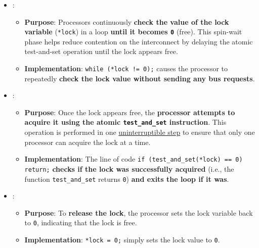 \begin{itemize}
    \item {}:
    \begin{itemize}
        \item \textbf{Purpose}: Processors continuously \textbf{check the value of the lock variable} (\texttt{*lock}) in a loop \textbf{until it becomes \texttt{0}} (free). This spin-wait phase helps reduce contention on the interconnect by delaying the atomic test-and-set operation until the lock appears free.
        \item \textbf{Implementation}: \texttt{while (*lock != 0);} causes the processor to repeatedly \textbf{check the lock value without sending any bus requests}.
    \end{itemize}
    
    \item {}:
    \begin{itemize}
        \item \textbf{Purpose}: Once the lock appears free, the \textbf{processor attempts to acquire it using the atomic \texttt{test\_and\_set} instruction}. This operation is performed in one \underline{uninterruptible step} to ensure that only one processor can acquire the lock at a time.
        \item \textbf{Implementation}: The line of code \texttt{if (test\_and\_set(*lock) == 0) return;} \textbf{checks if the lock was successfully acquired} (i.e., the function \texttt{test\_and\_set} returns \texttt{0}) \textbf{and exits the loop if it was}.
    \end{itemize}
    
    \item {}:
    \begin{itemize}
        \item \textbf{Purpose}: To \textbf{release the lock}, the processor sets the lock variable back to \texttt{0}, indicating that the lock is free.
        \item \textbf{Implementation}: \texttt{*lock = 0;} simply sets the lock value to \texttt{0}.
    \end{itemize}
\end{itemize}

\newpage

